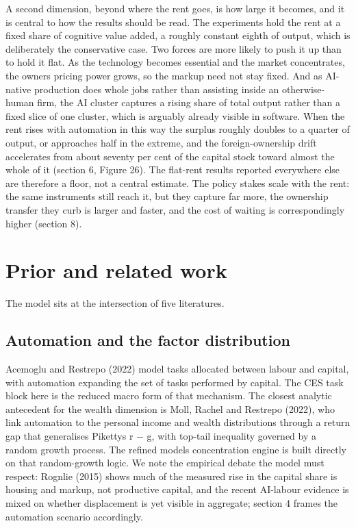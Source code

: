 \documentclass[11pt]{article}
\begin{document}
A second dimension, beyond where the rent goes, is how large it becomes,
and it is central to how the results should be read. The experiments
hold the rent at a fixed share of cognitive value added, a roughly
constant eighth of output, which is deliberately the conservative case.
Two forces are more likely to push it up than to hold it flat. As the
technology becomes essential and the market concentrates, the
owner\textquotesingle s pricing power grows, so the markup need not stay
fixed. And as AI-native production does whole jobs rather than assisting
inside an otherwise-human firm, the AI cluster captures a rising share
of total output rather than a fixed slice of one cluster, which is
arguably already visible in software. When the rent rises with
automation in this way the surplus roughly doubles to a quarter of
output, or approaches half in the extreme, and the foreign-ownership
drift accelerates from about seventy per cent of the capital stock
toward almost the whole of it (section 6, Figure 26). The flat-rent
results reported everywhere else are therefore a floor, not a central
estimate. The policy stakes scale with the rent: the same instruments
still reach it, but they capture far more, the ownership transfer they
curb is larger and faster, and the cost of waiting is correspondingly
higher (section 8).

\hypertarget{prior}{}
\hypertarget{prior-and-related-work}{%
\section{Prior and related work}\label{prior-and-related-work}}

The model sits at the intersection of five literatures.

\hypertarget{automation-and-the-factor-distribution}{%
\subsection{Automation and the factor
distribution}\label{automation-and-the-factor-distribution}}

Acemoglu and Restrepo (2022) model tasks allocated between labour and
capital, with automation expanding the set of tasks performed by
capital. The CES task block here is the reduced macro form of that
mechanism. The closest analytic antecedent for the wealth dimension is
Moll, Rachel and Restrepo (2022), who link automation to the personal
income and wealth distributions through a return gap that generalises
Piketty\textquotesingle s r $-$ g, with top-tail inequality governed by a
random growth process. The refined model\textquotesingle s concentration
engine is built directly on that random-growth logic. We note the
empirical debate the model must respect: Rognlie (2015) shows much of
the measured rise in the capital share is housing and markup, not
productive capital, and the recent AI-labour evidence is mixed on
whether displacement is yet visible in aggregate; section 4 frames the
automation scenario accordingly.
\end{document}
